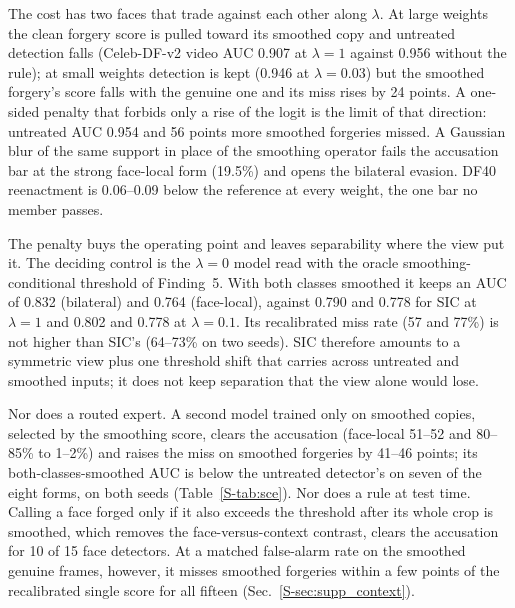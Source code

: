 \documentclass[journal]{IEEEtran}  %
\begin{document}
The cost has two faces that trade against each other along $\lambda$. At large weights the clean forgery score is pulled
toward its smoothed copy and untreated detection falls (Celeb-DF-v2 video AUC 0.907 at $\lambda=1$ against 0.956 without
the rule); at small weights detection is kept (0.946 at $\lambda=0.03$) but the smoothed forgery's score falls with the
genuine one and its miss rises by 24 points. A one-sided penalty that forbids only a rise of the logit is the limit of that
direction: untreated AUC 0.954 and 56 points more smoothed forgeries missed. A Gaussian blur of the same support in place of
the smoothing operator fails the accusation bar at the strong face-local form (19.5\%) and opens the bilateral evasion. DF40
reenactment is 0.06--0.09 below the reference at every weight, the one bar no member passes.

The penalty buys the operating point and leaves separability where the view put it. The deciding control is the $\lambda=0$ model read with
the oracle smoothing-conditional threshold of Finding~5. With both classes smoothed it keeps an AUC of 0.832 (bilateral) and
0.764 (face-local), against 0.790 and 0.778 for SIC at $\lambda=1$ and 0.802 and 0.778 at $\lambda=0.1$. Its
recalibrated miss rate (57 and 77\%) is not higher than SIC's (64--73\% on two seeds).
SIC therefore amounts to a symmetric view plus one threshold shift that carries across untreated and smoothed
inputs; it does not keep separation that the view alone would lose.

Nor does a routed expert. A second model trained only on
smoothed copies, selected by the smoothing score, clears the accusation (face-local 51--52 and 80--85\% to 1--2\%) and raises
the miss on smoothed forgeries by 41--46 points; its both-classes-smoothed AUC is below the untreated detector's on seven
of the eight forms, on both seeds (Table~\ref{S-tab:sce}).
Nor does a rule at test time. Calling a face forged only if it also exceeds the threshold after its whole crop is smoothed,
which removes the face-versus-context contrast, clears the accusation for 10 of 15 face detectors. At a matched false-alarm
rate on the smoothed genuine frames, however, it misses smoothed forgeries within a few points of the recalibrated single
score for all fifteen (Sec.~\ref{S-sec:supp_context}).
\end{document}
